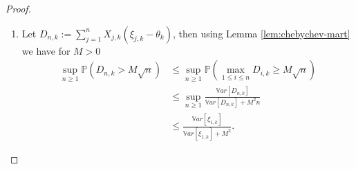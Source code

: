 \documentclass[11pt]{article}
\theoremstyle{plain}
\theoremstyle{definition}
\begin{document}
\begin{appendix}
\begin{proof}
\begin{enumerate}[label=(\roman*)]
\begin{align*}
			&\quad + \ell_{n} (\hat{\rho}_{\ell_{n},k} - \hat{\rho}_{n,k}) \\ 
			=& (n-\ell_{n})\left[-(1 - \alpha)v_k - (\hat{\rho}_{n,k} - v_k) + \frac{\alpha}{n - \ell_{n}}\sum_{m=\ell_{n}}^{n-1} (\hat{\rho}_{m,k} - v_k)\right]+ M_{n,k} - M_{\ell_{n},k} \\
			&\quad + \ell_{n} (\hat{\rho}_{\ell_{n},k} - \hat{\rho}_{n,k}) \\
		\end{align*}
		Theorem \ref{thm:LLN} applies here and gives that \(\lim_{n \to +\infty} \hat{\rho}_n = v\). If \(\left(\ell_{n}\right)_{n \geq 1}\) is bounded then it is stationary, so the Cesaro yields \(\frac{1}{n - \ell_{n}}\sum_{m=\ell_{n}}^{n-1} (\hat{\rho}_{m,k} - v_k) = o(1)\). Otherwise if \(\ell_{n} \to +\infty\), we have
		\begin{align*}
			\frac{1}{n - \ell_{n}}\left|\sum_{m=\ell_{n}}^{n-1} \hat{\rho}_{m,k} - v_k\right| &\leq \frac{1}{n - \ell_{n}}\sum_{m=\ell_{n}}^{n-1} |\hat{\rho}_{m,k} - v_k| \\
			&\leq \sup_{\ell_{n} \leq m \leq n}|\hat{\rho}_{m,k} - v_k| \to 0\;.
		\end{align*}		
		In both cases we obtain
		\begin{equation*}
			U_{n,k} - U_{\ell_{n},k} = (n - \ell_{n})[-(1 - \alpha)v_k + o(1)] + M_{n,k} - M_{\ell_{n},k} + \ell_{n} (\hat{\rho}_{\ell_{n},k} - \hat{\rho}_{n,k})
		\end{equation*}
		\item 
		Let \( D_{n,k} := \sum_{j=1}^{n} X_{j,k}(\xi_{j,k}-\theta_k) \), then using Lemma \ref{lem:chebychev-mart} we have for \( M>0 \)		
		\begin{align*}
			\sup_{n\geq 1} \mathbb{P}(D_{n,k} > M\sqrt{n})
			&\leq \sup_{n\geq 1}
			\mathbb{P}\!\left(\max_{1\leq i\leq n} D_{i,k} \geq M\sqrt{n}\right) \\
			&\leq \sup_{n\geq 1}
			\frac{\mathbb{V}ar\left[D_{n,k}\right]}
			{\mathbb{V}ar\left[D_{n,k}\right] + M^2 n} \\
			&\leq
			\frac{\mathbb{V}ar[\xi_{1,k}]}
			{\mathbb{V}ar[\xi_{1,k}] + M^2}.
		\end{align*}
		

\end{enumerate}
\end{proof}
\end{appendix}
\end{document}
